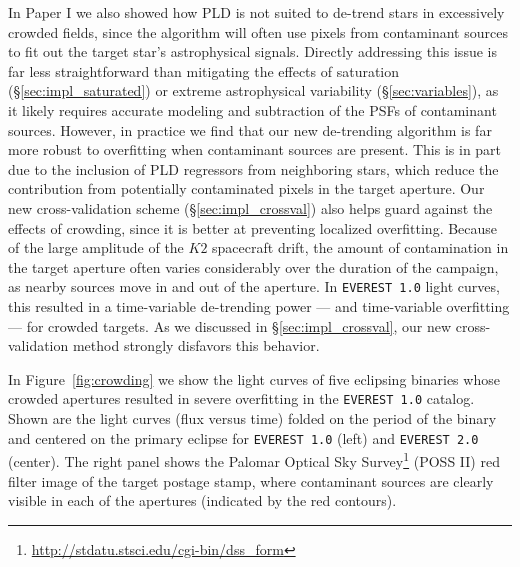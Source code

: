 \documentclass[]{emulateapj}
\begin{document}
In Paper I we also showed how PLD is not suited to de-trend stars in excessively crowded fields,
since the algorithm will often use pixels from contaminant sources to fit out the target star's astrophysical 
signals. Directly addressing this issue is far less straightforward than mitigating the effects of saturation (\S\ref{sec:impl_saturated})
or extreme astrophysical variability (\S\ref{sec:variables}), as it likely requires accurate modeling and
subtraction of the PSFs of contaminant sources. However, in practice we find that our new de-trending
algorithm is far more robust to overfitting when contaminant sources are present. This is in part
due to the inclusion of PLD regressors from neighboring stars, which reduce the contribution from
potentially contaminated pixels in the target aperture. Our new cross-validation scheme (\S\ref{sec:impl_crossval})
also helps guard against the effects of crowding, since it is better at preventing localized 
overfitting. Because of the large amplitude of the $K2$ spacecraft drift, the amount of contamination
in the target aperture often varies considerably over the duration of the campaign, as nearby sources
move in and out of the aperture. In \texttt{EVEREST 1.0} light curves, this resulted in a time-variable
de-trending power --- and time-variable overfitting --- for crowded targets. As we discussed in \S\ref{sec:impl_crossval},
our new cross-validation method strongly disfavors this behavior.

In Figure~\ref{fig:crowding} we show the light curves of five eclipsing binaries whose crowded apertures
resulted in severe overfitting in the \texttt{EVEREST 1.0} catalog. Shown are the light curves (flux versus time) folded
on the period of the binary and centered on the primary eclipse for \texttt{EVEREST 1.0} (left) and \texttt{EVEREST 2.0} (center).
The right panel shows the Palomar Optical Sky Survey\footnote{\url{http://stdatu.stsci.edu/cgi-bin/dss_form}} (POSS II)
red filter image of the target postage stamp, where contaminant sources are clearly visible in each of the apertures (indicated
by the red contours).
\end{document}
